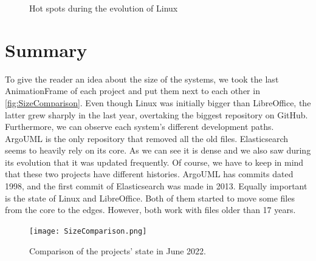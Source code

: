 \begin{figure}[ht]
    \caption{Hot spots during the evolution of Linux} 
    \label{fig:Linux_V7}
\end{figure}

\clearpage
\section{Summary}

To give the reader an idea about the size of the systems, we took the last AnimationFrame of each project and put them next to each other in \autoref{fig:SizeComparison}. Even though Linux was initially bigger than LibreOffice, the latter grew sharply in the last year, overtaking the biggest repository on GitHub. Furthermore, we can observe each system's different development paths. ArgoUML is the only repository that removed all the old files. Elasticsearch seems to heavily rely on its core. As we can see it is dense and we also saw during its evolution that it was updated frequently. Of course, we have to keep in mind that these two projects have different histories. ArgoUML has commits dated 1998, and the first commit of Elasticsearch was made in 2013. Equally important is the state of Linux and LibreOffice. Both of them started to move some files from the core to the edges. However, both work with files older than 17 years. 

\begin{figure}[ht]
    \centering
    \texttt{[image: SizeComparison.png]}
    \caption{Comparison of the projects' state in June 2022.} 
    \label{fig:SizeComparison}
\end{figure}
